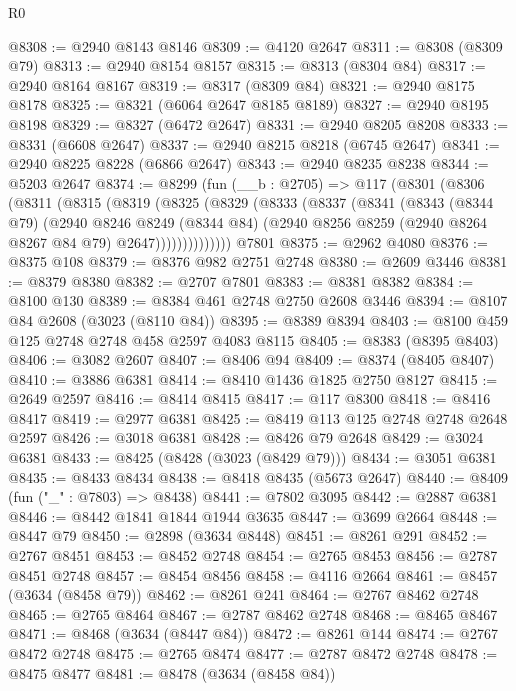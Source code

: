 \begin{lexlean}{R0}
\begin{coremodule}
@8308 := @2940 @8143 @8146
@8309 := @4120 @2647
@8311 := @8308 (@8309 @79)
@8313 := @2940 @8154 @8157
@8315 := @8313 (@8304 @84)
@8317 := @2940 @8164 @8167
@8319 := @8317 (@8309 @84)
@8321 := @2940 @8175 @8178
@8325 := @8321 (@6064 @2647 @8185 @8189)
@8327 := @2940 @8195 @8198
@8329 := @8327 (@6472 @2647)
@8331 := @2940 @8205 @8208
@8333 := @8331 (@6608 @2647)
@8337 := @2940 @8215 @8218 (@6745 @2647)
@8341 := @2940 @8225 @8228 (@6866 @2647)
@8343 := @2940 @8235 @8238
@8344 := @5203 @2647
@8374 := @8299
    (fun (__b : @2705) =>
    @117
      (@8301
        (@8306
          (@8311
            (@8315
              (@8319
                (@8325
                  (@8329
                    (@8333
                      (@8337
                        (@8341
                          (@8343
                            (@8344 @79)
                            (@2940
                              @8246
                              @8249
                              (@8344 @84)
                              (@2940 @8256 @8259 (@2940 @8264 @8267 @84 @79) @2647))))))))))))))
    @7801
@8375 := @2962 @4080
@8376 := @8375 @108
@8379 := @8376 @982 @2751 @2748
@8380 := @2609 @3446
@8381 := @8379 @8380
@8382 := @2707 @7801
@8383 := @8381 @8382
@8384 := @8100 @130
@8389 := @8384 @461 @2748 @2750 @2608 @3446
@8394 := @8107 @84 @2608 (@3023 (@8110 @84))
@8395 := @8389 @8394
@8403 := @8100 @459 @125 @2748 @2748 @458 @2597 @4083 @8115
@8405 := @8383 (@8395 @8403)
@8406 := @3082 @2607
@8407 := @8406 @94
@8409 := @8374 (@8405 @8407)
@8410 := @3886 @6381
@8414 := @8410 @1436 @1825 @2750 @8127
@8415 := @2649 @2597
@8416 := @8414 @8415
@8417 := @117 @8300
@8418 := @8416 @8417
@8419 := @2977 @6381
@8425 := @8419 @113 @125 @2748 @2748 @2648 @2597
@8426 := @3018 @6381
@8428 := @8426 @79 @2648
@8429 := @3024 @6381
@8433 := @8425 (@8428 (@3023 (@8429 @79)))
@8434 := @3051 @6381
@8435 := @8433 @8434
@8438 := @8418 @8435 (@5673 @2647)
@8440 := @8409 (fun ("_" : @7803) => @8438)
@8441 := @7802 @3095
@8442 := @2887 @6381
@8446 := @8442 @1841 @1844 @1944 @3635
@8447 := @3699 @2664
@8448 := @8447 @79
@8450 := @2898 (@3634 @8448)
@8451 := @8261 @291
@8452 := @2767 @8451
@8453 := @8452 @2748
@8454 := @2765 @8453
@8456 := @2787 @8451 @2748
@8457 := @8454 @8456
@8458 := @4116 @2664
@8461 := @8457 (@3634 (@8458 @79))
@8462 := @8261 @241
@8464 := @2767 @8462 @2748
@8465 := @2765 @8464
@8467 := @2787 @8462 @2748
@8468 := @8465 @8467
@8471 := @8468 (@3634 (@8447 @84))
@8472 := @8261 @144
@8474 := @2767 @8472 @2748
@8475 := @2765 @8474
@8477 := @2787 @8472 @2748
@8478 := @8475 @8477
@8481 := @8478 (@3634 (@8458 @84))

\end{coremodule}
\end{lexlean}
